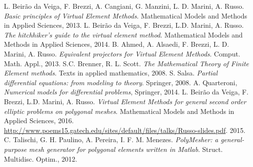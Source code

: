 \documentclass[10pt]{article}
\begin{document}
\begin{thebibliography}{}
	 L. Beir\~{a}o da Veiga, F. Brezzi, A. Cangiani, G. Manzini, L. D. Marini, A. Russo. \textit{Basic principles of Virtual Element Methods}. Mathematical Models and Methods in Applied Sciences, 2013. 
	 L. Beir\~{a}o da Veiga, F. Brezzi, L.D. Marini, A. Russo. \textit{The hitchhiker’s guide to the virtual element method}. Mathematical Models and Methods in Applied Sciences, 2014.
	 B. Ahmed, A. Alsaedi, F. Brezzi, L. D. Marini, A. Russo. \textit{Equivalent projectors for Virtual Element Methods}. Comput. Math. Appl., 2013.
	 S.C. Brenner, R. L. Scott.
	\textit{The Mathematical Theory of Finite Element methods}. Texts in applied mathematics, 2008.
	 S. Salsa. \textit{Partial differential equations: from modeling to theory}. Springer, 2008.
	 A. Quarteroni, \textit{Numerical models for differential problems}, Springer, 2014.
	 L. Beir\~{a}o da Veiga, F. Brezzi, L.D. Marini, A. Russo. \textit{Virtual Element Methods for general second order elliptic problems on polygonal meshes}. Mathematical Models and Methods in Applied Sciences, 2016.
	 \url{http://www.poems15.gatech.edu/sites/default/files/talks/Russo-slides.pdf}. 2015.
	 C. Talischi, G. H. Paulino, A. Pereira, I. F. M. Menezes. \textit{PolyMesher: a general-purpose mesh generator for polygonal elements written in Matlab}. Struct. Multidisc. Optim., 2012.
\end{thebibliography}
\end{document}
